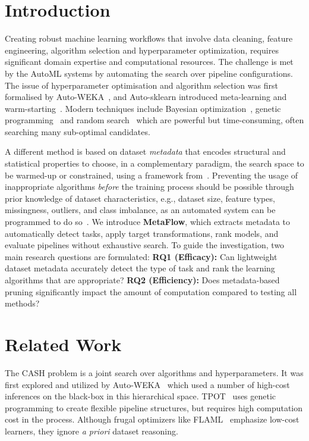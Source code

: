 \documentclass[runningheads]{llncs}
\begin{document}
\section{Introduction}
\label{sec:intro}

Creating robust machine learning workflows that involve data cleaning, feature engineering, algorithm selection and hyperparameter optimization, requires significant domain expertise and computational resources. The challenge is met by the AutoML systems by automating the search over pipeline configurations. The issue of hyperparameter optimisation and algorithm selection was first formalised by Auto-WEKA~\cite{thornton2013auto}, and Auto-sklearn introduced meta-learning and warm-starting~\cite{feurer2015efficient}. Modern techniques include Bayesian optimization~\cite{bergstra2011algorithms}, genetic programming~\cite{olson2016tpot} and random search~\cite{li2017hyperband} which are powerful but time-consuming, often searching many sub-optimal candidates.

A different method is based on dataset \emph{metadata} that encodes structural and statistical properties to choose, in a complementary paradigm, the search space to be warmed-up or constrained, using a framework from~\cite{leite2012survey}. Preventing the usage of inappropriate algorithms \emph{before} the training process should be possible through prior knowledge of dataset characteristics, e.g., dataset size, feature types, missingness, outliers, and class imbalance, as an automated system can be programmed to do so~\cite{wang2021flaml}. We introduce \textbf{MetaFlow}, which extracts metadata to automatically detect tasks, apply target transformations, rank models, and evaluate pipelines without exhaustive search. To guide the investigation, two main research questions are formulated: \textbf{RQ1 (Efficacy):} Can lightweight dataset metadata accurately detect the type of task and rank the learning algorithms that are appropriate? \textbf{RQ2 (Efficiency):} Does metadata-based pruning significantly impact the amount of computation compared to testing all methods?

\section{Related Work}
\label{sec:related}

The CASH problem is a joint search over algorithms and hyperparameters. It was first explored and utilized by Auto-WEKA~\cite{thornton2013auto} which used a number of high-cost inferences on the black-box in this hierarchical space. TPOT~\cite{olson2016tpot} uses genetic programming to create flexible pipeline structures, but requires high computation cost in the process. Although frugal optimizers like FLAML~\cite{wang2021flaml} emphasize low-cost learners, they ignore \emph{a priori} dataset reasoning.
\end{document}
